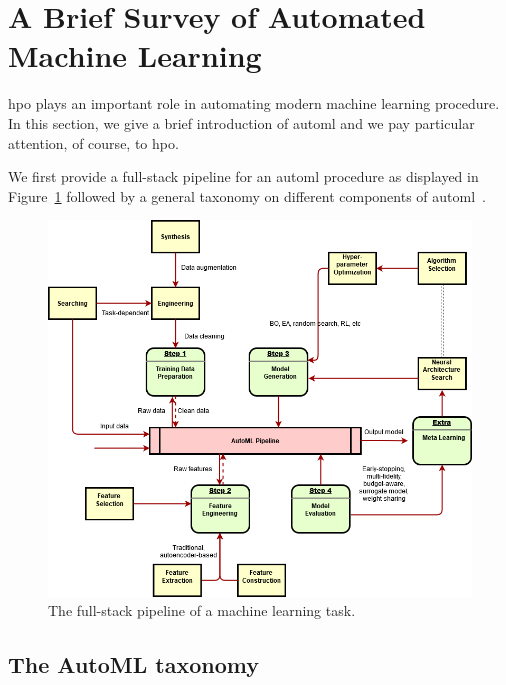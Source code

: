\section{A Brief Survey of Automated Machine Learning}\label{sec:dttts.survey}

\gls{hpo} plays an important role in automating modern machine learning procedure. In this section, we give a brief introduction of \gls{automl} and we pay particular attention, of course, to \gls{hpo}. 

We first provide a full-stack pipeline for an \gls{automl} procedure as displayed in Figure~\ref{fig:automl} followed by a general taxonomy on different components of \gls{automl}~\citep{hutter2019automl,zoller2019automl,he2019automl}. 

\begin{figure}[ht]
    \centering
    \includegraphics[width=\textwidth]{Chapter6/img/automl.png}
    \caption{The full-stack pipeline of a machine learning task.}
    \label{fig:automl}
\end{figure}


\subsection{The AutoML taxonomy}\label{sec:dttts.survey.taxonomy}

